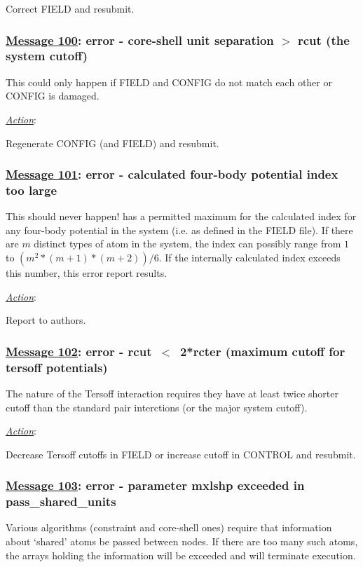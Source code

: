 Correct FIELD and resubmit.

\subsubsection*{\underline{Message 100}: error - core-shell unit separation $>$ rcut (the system cutoff)}

This could only happen if FIELD and CONFIG do not match each other
or CONFIG is damaged.

\noindent \underline{\em Action}:

Regenerate CONFIG (and FIELD) and resubmit.

\subsubsection*{\underline{Message 101}: error - calculated four-body potential index too large}

This should never happen!  \D has a permitted maximum for the
calculated index for any four-body potential in the system (i.e.
as defined in the FIELD file).  If there are $m$ distinct types of
atom in the system, the index can possibly range from $1$ to
$(m^{2}*(m+1)*(m+2))/6$.  If the internally calculated index
exceeds this number, this error report results.

\noindent \underline{\em Action}:

Report to authors.

\subsubsection*{\underline{Message 102}: error - rcut~$<$~2*rcter (maximum cutoff for tersoff potentials)}

The nature of the Tersoff interaction requires they have at least
twice shorter cutoff than the standard pair interctions (or the
major system cutoff).

\noindent \underline{\em Action}:

Decrease Tersoff cutoffs in FIELD or increase cutoff in CONTROL
and resubmit.

\subsubsection*{\underline{Message 103}: error - parameter mxlshp exceeded in pass\_shared\_units}

Various algorithms (constraint and core-shell ones) require that
information about `shared' atoms be passed between nodes.  If
there are too many such atoms, the arrays holding the information
will be exceeded and \D will terminate execution.

